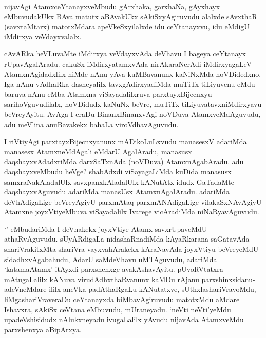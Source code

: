 \begin{artha}
nijavAgi AtamxceYtanayxveMbudu gArxhaka, garxhaNa, gAyxhayx eMbuvudakUkx BAva matutx aBAvakUkx sAkiSxyAgiruvudu alalxde sAvxthaR (savxtaMtarx) matotxMdara apeVkeSxyilalxde idu ceYtanayxvu, idu eMdigU iMdirxya veVdayxvalalx. 
\end{artha}

\begin{artha}
cAvARka heVLuvaMte iMdirxya veVdayxvAda deVhavu I bageya ceYtanayx rUpavAgalAradu. cakuSx iMdirxyatamxvAda nirAkaraNerAdi iMdirxyagaLeV AtamxnAgidadxlilx hiMde nAnu yAva kuMBavanunx kaNiNxMda noVDidedxno. Iga nAnu vAdhaRka dasheyalilx tavxgAdirxyadiMda muTiTx tiLiyuvenu eMdu baruva nAnu eMba Atamxna viSayadalilxruva parxtayxBijecnxyu sarihoVguvudilalx, noVDidudx kaNuNx beVre, muTiTx tiLiyuvatavxniMdirxyavu beVreyAyitu. AvAga I eraDu BinanxBinanxvAgi noVDuva AtamxveMdAguvudu, adu meVlina anuBavakekx bahaLa viroVdhavAguvudu.  
\end{artha}


\begin{artha}
I riVtiyAgi parxtayxBijecnxyanunx mADikoLuLxvudu manasesxV adariMda manasesx AtamxneMdAgali eMdarU AgalAradu, manasusx daqshayxvAdadxriMda darxSaTxnAda (noVDuva) AtamxnAgabAradu. adu daqshayxveMbudu heVge? shabAdxdi viSayagaLiMda kuDida manasusx samxraNakAladalUlx savxpanxkAladalUlx kANutAtx idudx GaTadaMte daqshayxvAguvudu adariMda manasUsx AtamxnAgalAradu. adariMda deVhAdigaLige beVreyAgiyU parxmAtaq parxmANAdigaLige vilakaSxNAvAgiyU Atamxne joyxVtiyeMbuva viSayadalilx Ivarege vicAradiMda niNaRyavAguvudu. 
\end{artha}


\begin{artha}
`\stext ' eMbudariMda I deVhakekx joyxVtiye Atamx savxrUpaveMdU athaRvAguvudu. sUyARdigaLa nidashaRnadiMda kAyaRkarana saGatavAda shariVrakitxMta shariVra vayxvahArakekx kAraNavAda joyxVtiyu beVreyeMdU sidadhxvAgabahudu, AdarU saMdeVhavu uMTAguvudu, adariMda `katamaAtamx' itAyxdi parxshenxge avakAshavAyitu. pUvoRVtatxra mAtugaLalilx kANuva virudAdhxthaRvanunx kaMDu rAjanu parxshinxsidanu-adeVneMdare ililx aneVka padAthaRgaLu kANutatxve, sUthxlashariVravoMdu, liMgashariVraveraDu ceYtanayxda biMbavAgiruvudu matotxMdu aMdare Ishavxra, sAkiSx ceVtana eMbuvudu, mUraneyadu. `neVti neVti'yeMdu upadeVshisidudx nAlukxneyadu ivugaLalilx yAvudu nijavAda AtamxveMdu parxshenxya aBipArxya. 
\end{artha}

